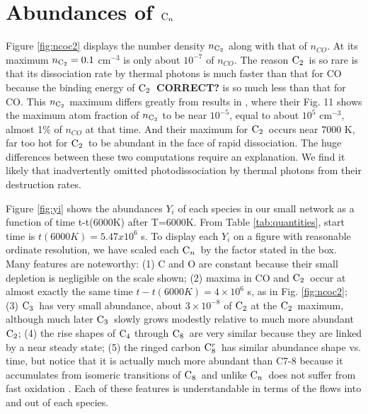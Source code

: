 \documentclass[manuscript]{aastex}
\newcommand{\ctwo}{{\rm C}_2}
\newcommand{\cthree}{{\rm C}_3}
\newcommand{\cfour}{{\rm C}_4}
\newcommand{\ceight}{{\rm C}_8}
\newcommand{\ceightr}{{\rm C}_8^r}
\newcommand{\cenn}{{\rm C}_n}
\begin{document}
\section{Abundances of $\cenn$}

Figure \ref{fig:ncoc2} displays the number density $n_{\ctwo}$ along with
that of $n_{CO}$. At its maximum $n_{\ctwo} =0.1$ cm$^{-3}$ is only about
$10^{-7}$ of $n_{CO}$. The reason $\ctwo$\ is so rare is that its dissociation
rate by thermal photons is much faster than that for CO because the binding
energy of {\bf $\ctwo$\ CORRECT?} is
so much less than that for CO. This $n_{\ctwo}$
maximum differs greatly
from results in \citet{2009ApJ...703..642C}, where their Fig. 11 shows the
maximum atom fraction of $n_{\ctwo}$ to be near $10^{-5}$,
equal to about $10^5$ cm$^{-3}$, almost 1\% of $n_{CO}$ at that time.
And their maximum for $\ctwo$\ occurs near 7000 K, far too hot for $\ctwo$\ to
be abundant in the face of rapid dissociation. The huge differences between
these two computations require an explanation. We find it likely that
\cite{2009ApJ...703..642C} inadvertently omitted photodissociation by thermal
photons from their destruction rates.  


Figure \ref{fig:yi}
shows the abundances $Y_i$ of each species in our small network as a
function of time t-t(6000K) after T=6000K. From Table \ref{tab:quantities},
start time is $t(6000K) =5.47x10^6$ s. To display each $Y_i$ on a figure with
reasonable ordinate resolution, we have scaled each $\cenn$\ by the factor
stated in the box. Many features are noteworthy: (1) C and O are constant
because their small depletion is negligible on the scale shown;
(2) maxima in CO and $\ctwo$\ occur at almost exactly the same time
$t-t(6000K)= 4 \times 10^6$ s, as in Fig. \ref{fig:ncoc2};
(3) $\cthree$\ has very small abundance, about $3 \times 10^{-8}$ of $\ctwo$
at the $\ctwo$\ maximum, although much later $\cthree$\ slowly grows modestly
relative to much more abundant $\ctwo$; (4) the rise shapes of $\cfour$
through $\ceight$\ are very similar because they are linked by a near steady
state; (5) the ringed carbon $\ceightr$\ has similar abundance shape vs. time,
but notice that it is actually much more abundant than C7-8 because it
accumulates from isomeric transitions of $\ceight$\ and unlike $\cenn$\ does not
suffer from fast oxidation \citep{1999Sci...283.1290C}. Each of these
features is understandable in terms of the flows into and out of each species. 
\end{document}

